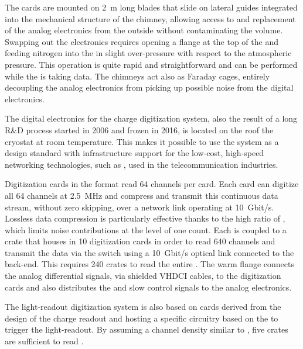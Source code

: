 The  cards are mounted on \SI{2}{m} long blades that slide on lateral guides integrated into the mechanical structure of the chimney, allowing access to and replacement of the analog  electronics from the outside without contaminating the  volume. 
Swapping out the  electronics requires opening a flange at the top of the  and feeding nitrogen into the  in slight over-pressure with respect to the atmospheric pressure.  This operation is quite rapid and straightforward and can be performed while the  is taking data. The chimneys act also as Faraday cages, entirely decoupling the analog  electronics 
from picking up possible noise from the digital electronics.   

The digital electronics for the charge digitization system, also the result of a long R\&D process started in 2006 and frozen in 2016, is located 
on the roof the cryostat at room temperature. This makes it possible to use the system as a design standard with infrastructure support for the low-cost, high-speed networking technologies, such as , used in the telecommunication industries. 

Digitization cards in the  format read \num{64} channels per card. Each  card can digitize all  \num{64} channels at \SI{2.5}{MHz} and compress and transmit this continuous data stream, without zero skipping, over a network link operating at \SI{10}{Gbit/s}. Lossless data compression is particularly effective thanks to the high  ratio  of , which limits noise contributions at the level of one  count. Each  is coupled to a  crate that houses in \num{10}  digitization cards in order to read  \num{640} channels and transmit the data via the  switch using a \SI{10}{Gbit/s} optical link connected to the  back-end. This requires \num{240}  crates to read the entire . The  warm flange connects the analog differential signals, via shielded VHDCI cables, to the  digitization cards and also distributes the  and slow control signals to the analog  electronics.  

The light-readout digitization system is also based on   cards derived from the design of the charge readout and hosting a specific circuitry based on the   to trigger the light-readout. By assuming a  channel density similar to , five  crates are sufficient to read \dpnumpmtch {}.

